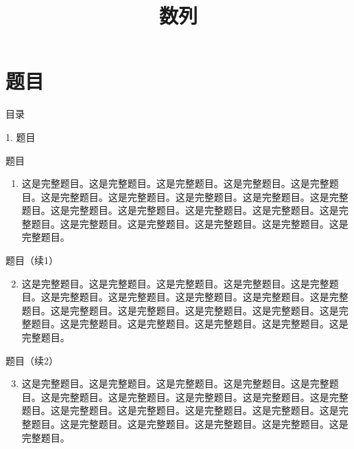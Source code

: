 \documentclass[aspectratio=169,10pt,fontset=fandol]{ctexbeamer}
\title{数列}
\begin{document}
\section{题目}
\begin{frame}[t,fragile]{目录}
\normalsize
{\color{blue}\normalsize 1. 题目\par}\vspace{0.3em}
\end{frame}
\begin{frame}[t,fragile]{题目}
\normalsize
{\normalsize
\begin{enumerate}\item 这是完整题目。这是完整题目。这是完整题目。这是完整题目。这是完整题目。这是完整题目。这是完整题目。这是完整题目。这是完整题目。这是完整题目。这是完整题目。这是完整题目。这是完整题目。这是完整题目。这是完整题目。这是完整题目。这是完整题目。这是完整题目。这是完整题目。这是完整题目。

\end{enumerate}
}
\end{frame}
\begin{frame}[t,fragile]{题目（续1）}
\normalsize
{\normalsize
\begin{enumerate}\setcounter{enumi}{1}
\item 这是完整题目。这是完整题目。这是完整题目。这是完整题目。这是完整题目。这是完整题目。这是完整题目。这是完整题目。这是完整题目。这是完整题目。这是完整题目。这是完整题目。这是完整题目。这是完整题目。这是完整题目。这是完整题目。这是完整题目。这是完整题目。这是完整题目。这是完整题目。

\end{enumerate}
}
\end{frame}
\begin{frame}[t,fragile]{题目（续2）}
\normalsize
{\normalsize
\begin{enumerate}\setcounter{enumi}{2}
\item 这是完整题目。这是完整题目。这是完整题目。这是完整题目。这是完整题目。这是完整题目。这是完整题目。这是完整题目。这是完整题目。这是完整题目。这是完整题目。这是完整题目。这是完整题目。这是完整题目。这是完整题目。这是完整题目。这是完整题目。这是完整题目。这是完整题目。这是完整题目。

\end{enumerate}
}
\end{frame}
\end{document}
